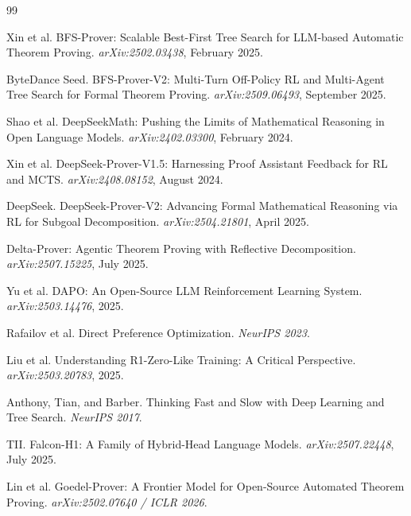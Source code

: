 \documentclass[11pt,a4paper]{article}
\begin{document}
\begin{thebibliography}{99}

Xin et al.
\newblock BFS-Prover: Scalable Best-First Tree Search for LLM-based Automatic Theorem Proving.
\newblock \emph{arXiv:2502.03438}, February 2025.

ByteDance Seed.
\newblock BFS-Prover-V2: Multi-Turn Off-Policy RL and Multi-Agent Tree Search for Formal Theorem Proving.
\newblock \emph{arXiv:2509.06493}, September 2025.

Shao et al.
\newblock DeepSeekMath: Pushing the Limits of Mathematical Reasoning in Open Language Models.
\newblock \emph{arXiv:2402.03300}, February 2024.

Xin et al.
\newblock DeepSeek-Prover-V1.5: Harnessing Proof Assistant Feedback for RL and MCTS.
\newblock \emph{arXiv:2408.08152}, August 2024.

DeepSeek.
\newblock DeepSeek-Prover-V2: Advancing Formal Mathematical Reasoning via RL for Subgoal Decomposition.
\newblock \emph{arXiv:2504.21801}, April 2025.

Delta-Prover: Agentic Theorem Proving with Reflective Decomposition.
\newblock \emph{arXiv:2507.15225}, July 2025.

Yu et al.
\newblock DAPO: An Open-Source LLM Reinforcement Learning System.
\newblock \emph{arXiv:2503.14476}, 2025.

Rafailov et al.
\newblock Direct Preference Optimization.
\newblock \emph{NeurIPS 2023}.

Liu et al.
\newblock Understanding R1-Zero-Like Training: A Critical Perspective.
\newblock \emph{arXiv:2503.20783}, 2025.

Anthony, Tian, and Barber.
\newblock Thinking Fast and Slow with Deep Learning and Tree Search.
\newblock \emph{NeurIPS 2017}.

TII.
\newblock Falcon-H1: A Family of Hybrid-Head Language Models.
\newblock \emph{arXiv:2507.22448}, July 2025.

Lin et al.
\newblock Goedel-Prover: A Frontier Model for Open-Source Automated Theorem Proving.
\newblock \emph{arXiv:2502.07640 / ICLR 2026}.


\end{thebibliography}
\end{document}
